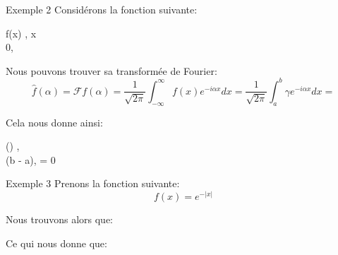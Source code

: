 \documentclass[a4paper]{article}
\begin{document}
\begin{parag}{Exemple 2}
    Considérons la fonction suivante:
    \begin{functionbypart}{f\left(x\right)}
    \gamma, \mathspace {} x \in \left[a, b\right]  \\
    0, \mathspace {}
    \end{functionbypart}

    Nous pouvons trouver sa transformée de Fourier: 
    \[\hat{f}\left(\alpha\right) = \mathcal{F}f\left(\alpha\right) = \frac{1}{\sqrt{2\pi}} \int_{-\infty}^{\infty} f\left(x\right)e^{-i\alpha x} dx = \frac{1}{\sqrt{2\pi}} \int_{a}^{b} \gamma e^{-i\alpha x} dx = \]

    Cela nous donne ainsi:
    \begin{functionbypart}{\left(\alpha\right)}
         \frac{-\gamma}{\sqrt{2\pi}} , \mathspace {} \alpha {}    \\
         \frac{\gamma}{\sqrt{2\pi}}\left(b - a\right), \mathspace {} \alpha = 0
    \end{functionbypart}
\end{parag}

\begin{parag}{Exemple 3}
    Prenons la fonction suivante: 
    \[f\left(x\right) = e^{-\left|x\right|}\]

    Nous trouvons alors que: 

    Ce qui nous donne que:
    
\end{parag}
\end{document}
